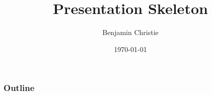 \documentclass[10pt]{beamer}
\title{Presentation Skeleton}
\author{Benjamin Christie}
\date{\today}
\theoremstyle{definition}
\begin{document}
\begin{frame}
	\titlepage
\end{frame}
\begin{frame}
	\frametitle{Outline}
	\tableofcontents
\end{frame}
\section{}
\begin{frame}
	\frametitle{}
\end{frame}
\end{document}
